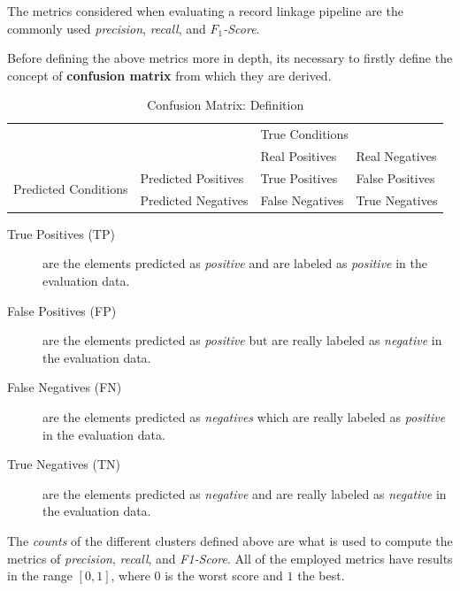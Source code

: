 \documentclass[epsfig,a4paper,11pt,titlepage,twoside,openany]{book}
\begin{document}
The metrics considered when evaluating a record linkage pipeline are the commonly used
\cite{Powers2011_evaluation} \textit{precision}, \textit{recall}, and
\textit{$F_1$-Score}.

Before defining the above metrics more in depth, its necessary to firstly define the
concept of \textbf{confusion matrix} from which they are derived.

\begin{table}[H]
  \centering
  \begin{tabular}{ll|l|l|}
    \cline{3-4}
    &                     & \multicolumn{2}{l|}{True Conditions} \\ \cline{3-4} 
    &                     & Real Positives  & Real Negatives     \\ \hline
    \multicolumn{1}{|l|}{\multirow{2}{*}{Predicted Conditions}} & Predicted Positives & True Positives  & False Positives    \\ \cline{2-4} 
    \multicolumn{1}{|l|}{}                                      & Predicted Negatives & False Negatives & True Negatives     \\ \hline
  \end{tabular}
  \caption{Confusion Matrix: Definition}
  \label{tab:confusion-matrix-definition}
\end{table}

\begin{description}
\item[True Positives (TP)] are the elements predicted as \textit{positive}
  and are labeled as \textit{positive} in the evaluation data.
 
\item[False Positives (FP)] are the elements predicted as \textit{positive}
  but are really labeled as \textit{negative} in the evaluation data.
 
\item[False Negatives (FN)] are the elements predicted as \textit{negatives}
  which are really labeled as \textit{positive} in the evaluation data.
 
\item[True Negatives (TN)] are the elements predicted as \textit{negative}
  and are really labeled as \textit{negative} in the evaluation data.
\end{description}


The \textit{counts} of the different clusters defined above are what is used to compute the metrics of \textit{precision}, \textit{recall}, and \textit{F1-Score}. All of the employed metrics have results in the range $[0,1]$, where $0$ is the worst score and $1$ the best.
\end{document}
